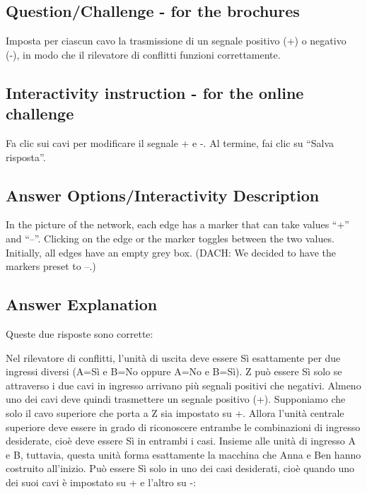 \documentclass[a4paper,11pt]{report}
\newcommand{\taskGraphicsFolder}{..}
\begin{document}
{\em


\subsection*{Question/Challenge - for the brochures}

Imposta per ciascun cavo la trasmissione di un segnale positivo (+) o negativo (-), in modo che il rilevatore di conflitti funzioni correttamente.

{\centering%
\par}

}


\subsection*{Interactivity instruction - for the online challenge}

Fa clic sui cavi per modificare il segnale + e -. Al termine, fai clic su \enquote{Salva risposta}.

\begingroup
\renewcommand{\arraystretch}{1.5}
\subsection*{Answer Options/Interactivity Description}

In the picture of the network, each edge has a marker that can take values \enquote{+} and \enquote{–}. Clicking on the edge or the marker toggles between the two values. Initially, all edges have an empty grey box.  (DACH: We decided to have the markers preset to –.)

\endgroup

\subsection*{Answer Explanation}

Queste due risposte sono corrette:

{\centering%
\raisebox{-0.5ex}{} \raisebox{-0.5ex}{}\par}

Nel rilevatore di conflitti, l’unità di uscita deve essere Sì esattamente per due ingressi diversi (A=Sì e B=No oppure A=No e B=Sì). Z può essere Sì solo se attraverso i due cavi in ingresso arrivano più segnali positivi che negativi.  Almeno uno dei cavi deve quindi trasmettere un segnale positivo (+).  Supponiamo che solo il cavo superiore che porta a Z sia impostato su +.  Allora l’unità centrale superiore deve essere in grado di riconoscere entrambe le combinazioni di ingresso desiderate, cioè deve essere Sì in entrambi i casi.  Insieme alle unità di ingresso A e B, tuttavia, questa unità forma esattamente la macchina che Anna e Ben hanno costruito all’inizio. Può essere Sì solo in uno dei casi desiderati, cioè quando uno dei suoi cavi è impostato su + e l’altro su -:
\end{document}
